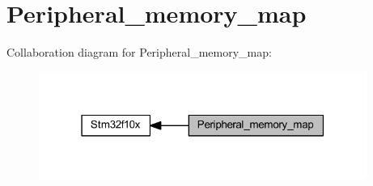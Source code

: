 \hypertarget{group___peripheral__memory__map}{}\section{Peripheral\+\_\+memory\+\_\+map}
\label{group___peripheral__memory__map}
Collaboration diagram for Peripheral\+\_\+memory\+\_\+map\+:
\nopagebreak
\begin{figure}[H]
\begin{center}
\leavevmode
\includegraphics[width=304pt]{group___peripheral__memory__map}
\end{center}
\end{figure}
